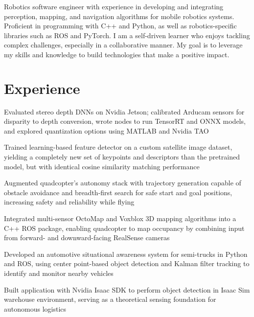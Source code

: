 \documentclass{resume}
\begin{document}


\begin{personalstatement}
  Robotics software engineer with experience in developing and integrating perception,
  mapping, and navigation algorithms for mobile robotics systems. Proficient in
  programming with C++ and Python, as well as robotics-specific libraries such as ROS and
  PyTorch. I am a self-driven learner who enjoys tackling complex challenges, especially
  in a collaborative manner. My goal is to leverage my skills and knowledge to build
  technologies that make a positive impact.
\end{personalstatement}

\section{Experience}

\begin{details}
\item Evaluated stereo depth DNNs on Nvidia Jetson; calibrated Arducam sensors for
  disparity to depth conversion, wrote nodes to run TensorRT and ONNX models, and
  explored quantization options using MATLAB and Nvidia TAO
\item Trained learning-based feature detector on a custom satellite image dataset,
  yielding a completely new set of keypoints and descriptors than the pretrained model,
  but with identical cosine similarity matching performance
\item Augmented quadcopter’s autonomy stack with trajectory generation capable of
  obstacle avoidance and breadth-first search for safe start and goal positions,
  increasing safety and reliability while flying
\item Integrated multi-sensor OctoMap and Voxblox 3D mapping algorithms into a C++ ROS
  package, enabling quadcopter to map occupancy by combining input from forward- and
  downward-facing RealSense cameras
\end{details}

\begin{details}
\item Developed an automotive situational awareness system for semi-trucks in Python and
  ROS, using center point-based object detection and Kalman filter tracking to identify
  and monitor nearby vehicles
\item Built application with Nvidia Isaac SDK to perform object detection in Isaac Sim
  warehouse environment, serving as a theoretical sensing foundation for autonomous logistics
\end{details}
\end{document}
